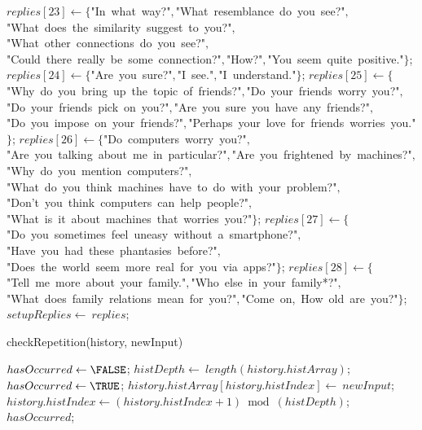 \documentclass[a4paper,10pt]{article}
\begin{document}
\begin{algorithm}
\begin{algorithmic}[5]
  \STATE \(replies[23]\gets\{\)"{}In\ what\ way?"{}\(,\)"{}What\ resemblance\ do\ you\ see?"{}\(,\)"{}What\ does\ the\ similarity\ suggest\ to\ you?"{}\(,\)"{}What\ other\ connections\ do\ you\ see?"{}\(,\)"{}Could\ there\ really\ be\ some\ connection?"{}\(,\)"{}How?"{}\(,\)"{}You\ seem\ quite\ positive."{}\(\}\);
  \STATE \(replies[24]\gets\{\)"{}Are\ you\ sure?"{}\(,\)"{}I\ see."{}\(,\)"{}I\ understand."{}\(\}\);
  \STATE \(replies[25]\gets\{\)"{}Why\ do\ you\ bring\ up\ the\ topic\ of\ friends?"{}\(,\)"{}Do\ your\ friends\ worry\ you?"{}\(,\)"{}Do\ your\ friends\ pick\ on\ you?"{}\(,\)"{}Are\ you\ sure\ you\ have\ any\ friends?"{}\(,\)"{}Do\ you\ impose\ on\ your\ friends?"{}\(,\)"{}Perhaps\ your\ love\ for\ friends\ worries\ you."{}\(\}\);
  \STATE \(replies[26]\gets\{\)"{}Do\ computers\ worry\ you?"{}\(,\)"{}Are\ you\ talking\ about\ me\ in\ particular?"{}\(,\)"{}Are\ you\ frightened\ by\ machines?"{}\(,\)"{}Why\ do\ you\ mention\ computers?"{}\(,\)"{}What\ do\ you\ think\ machines\ have\ to\ do\ with\ your\ problem?"{}\(,\)"{}Don'{}t\ you\ think\ computers\ can\ help\ people?"{}\(,\)"{}What\ is\ it\ about\ machines\ that\ worries\ you?"{}\(\}\);
  \STATE \(replies[27]\gets\{\)"{}Do\ you\ sometimes\ feel\ uneasy\ without\ a\ smartphone?"{}\(,\)"{}Have\ you\ had\ these\ phantasies\ before?"{}\(,\)"{}Does\ the\ world\ seem\ more\ real\ for\ you\ via\ apps?"{}\(\}\);
  \STATE \(replies[28]\gets\{\)"{}Tell\ me\ more\ about\ your\ family."{}\(,\)"{}Who\ else\ in\ your\ family*?"{}\(,\)"{}What\ does\ family\ relations\ mean\ for\ you?"{}\(,\)"{}Come\ on,\ How\ old\ are\ you?"{}\(\}\);
  \STATE \(setupReplies\gets\ replies\);

\end{algorithmic}
\end{algorithm}


\begin{algorithm}
\caption{checkRepetition(history, newInput)}
\begin{algorithmic}[5]

\STATE {}
\STATE {}
  \STATE \(hasOccurred\gets\FALSE\);
    \STATE \(histDepth\gets\ length(history.histArray)\);
        \STATE \(hasOccurred\gets\TRUE\);
      \ENDIF
    \ENDFOR
    \STATE \(history.histArray[history.histIndex]\gets\ newInput\);
    \STATE \(history.histIndex\gets(history.histIndex+1)\bmod(histDepth)\);
  \ENDIF
  \RETURN\(hasOccurred\);

\end{algorithmic}
\end{algorithm}
\end{document}
